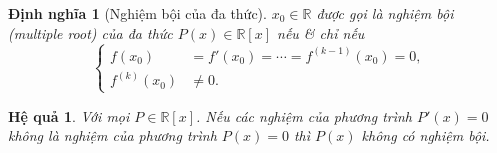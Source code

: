 \documentclass{article}
\newtheorem{dinhnghia}{Định nghĩa}
\newtheorem{hequa}{Hệ quả}
\begin{document}
\begin{dinhnghia}[Nghiệm bội của đa thức]
	$x_0\in\mathbb{R}$ được gọi là {\rm nghiệm bội} (multiple root) của đa thức $P(x)\in\mathbb{R}[x]$ nếu \& chỉ nếu
	\begin{equation*}
		\left\{\begin{split}
			f(x_0) &= f'(x_0) = \cdots = f^{(k - 1)}(x_0) = 0,\\
			f^{(k)}(x_0)&\ne0.
		\end{split}\right.
	\end{equation*}
\end{dinhnghia}

\begin{hequa}
	Với mọi $P\in\mathbb{R}[x]$. Nếu các nghiệm của phương trình $P'(x) = 0$ không là nghiệm của phương trình $P(x) = 0$ thì $P(x)$ không có nghiệm bội.
\end{hequa}
\end{document}
